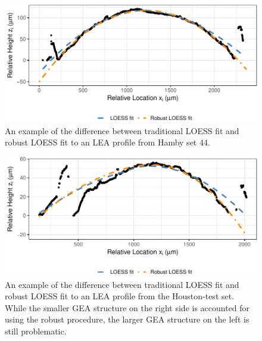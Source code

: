 \documentclass[12pt]{article}
\begin{document}
\begin{figure}
\centering
\includegraphics{writeup_files/figure-latex/loess-vs-locfit-1.pdf}
\caption{\label{loess-vs-locfit}An example of the difference between
traditional LOESS fit and robust LOESS fit to an LEA profile from Hamby
set 44.}
\end{figure}

\begin{figure}
\centering
\includegraphics{writeup_files/figure-latex/houston-locfit-1.pdf}
\caption{\label{houston-locfit}An example of the difference between
traditional LOESS fit and robust LOESS fit to an LEA profile from the
Houston-test set. While the smaller GEA structure on the right side is
accounted for using the robust procedure, the larger GEA structure on
the left is still problematic.}
\end{figure}
\end{document}

